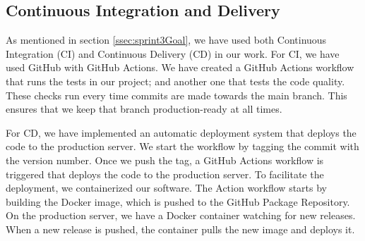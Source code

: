 \subsection{Continuous Integration and Delivery}\label{CI/CD}
As mentioned in section \ref{ssec:sprint3Goal},  we have used both Continuous Integration (CI) and Continuous Delivery (CD) in our work.
For CI, we have used GitHub with GitHub Actions. We have created a GitHub Actions workflow that
runs the tests in our project; and another one that tests the code quality. These checks run every time commits are made towards the main branch. This ensures that we keep that branch production-ready
at all times.

For CD, we have implemented an automatic deployment system that deploys the code to the production server.
We start the workflow by tagging the commit with the version number. Once we push the tag, a GitHub Actions
workflow is triggered that deploys the code to the production server.
To facilitate the deployment, we containerized our software. The Action workflow starts by building the
Docker image, which is pushed to the GitHub Package Repository. On the production server, we have a Docker 
container watching for new releases. When a new release is pushed, the container pulls the new image and
deploys it.
